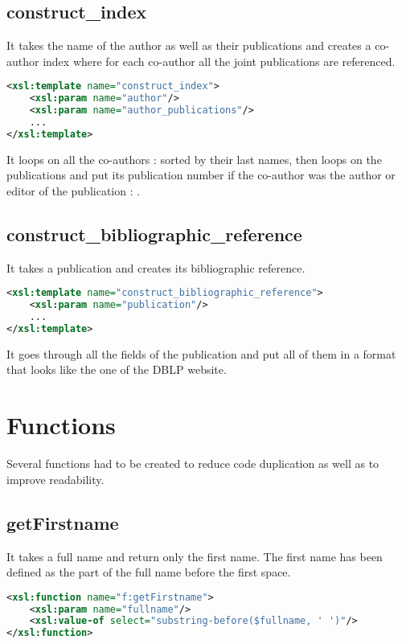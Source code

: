 \documentclass{article}[a4]
\begin{document}
\subsection{construct\_index}
It takes the name of the author as well as their publications and creates a co-author index where for each co-author all the joint publications are referenced.

\begin{lstlisting}[language=XML]
<xsl:template name="construct_index">
	<xsl:param name="author"/>
	<xsl:param name="author_publications"/>
	...
</xsl:template>
\end{lstlisting}

It loops on all the co-authors :  sorted by their last names, then loops on the publications  and put its publication number if the co-author was the author or editor of the publication : .

\subsection{construct\_bibliographic\_reference}
It takes a publication and creates its bibliographic reference. 

\begin{lstlisting}[language=XML]
<xsl:template name="construct_bibliographic_reference">
	<xsl:param name="publication"/>
	...
</xsl:template>
\end{lstlisting}

It goes through all the fields of the publication and put all of them in a format that looks like the one of the DBLP website.

\section{Functions}
Several functions had to be created to reduce code duplication as well as to improve readability.

\subsection{getFirstname}

It takes a full name and return only the first name. The first name has been defined as the part of the full name before the first space.

\begin{lstlisting}[language=XML]
<xsl:function name="f:getFirstname">
	<xsl:param name="fullname"/>
	<xsl:value-of select="substring-before($fullname, ' ')"/>
</xsl:function>
\end{lstlisting}
\end{document}
